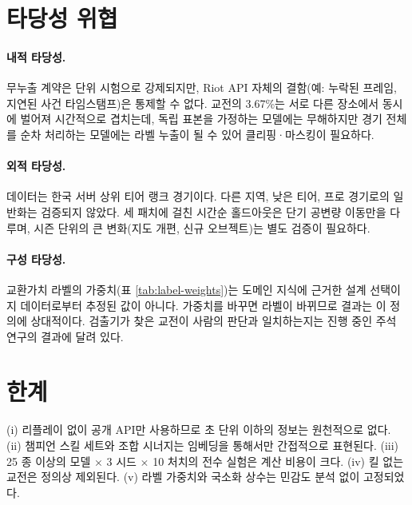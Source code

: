 \section{타당성 위협}
\label{sec:disc-threats}

\paragraph{내적 타당성.} 무누출 계약은 단위 시험으로 강제되지만, Riot API 자체의 결함(예: 누락된 프레임, 지연된 사건 타임스탬프)은 통제할 수 없다. 교전의 3.67\%는 서로 다른 장소에서 동시에 벌어져 시간적으로 겹치는데, 독립 표본을 가정하는 모델에는 무해하지만 경기 전체를 순차 처리하는 모델에는 라벨 누출이 될 수 있어 클리핑·마스킹이 필요하다.

\paragraph{외적 타당성.} 데이터는 한국 서버 상위 티어 랭크 경기이다. 다른 지역, 낮은 티어, 프로 경기로의 일반화는 검증되지 않았다. 세 패치에 걸친 시간순 홀드아웃은 단기 공변량 이동만을 다루며, 시즌 단위의 큰 변화(지도 개편, 신규 오브젝트)는 별도 검증이 필요하다.

\paragraph{구성 타당성.} 교환가치 라벨의 가중치(표 \ref{tab:label-weights})는 도메인 지식에 근거한 설계 선택이지 데이터로부터 추정된 값이 아니다. 가중치를 바꾸면 라벨이 바뀌므로 결과는 이 정의에 상대적이다. 검출기가 찾은 교전이 사람의 판단과 일치하는지는 진행 중인 주석 연구의 결과에 달려 있다.

\section{한계}
\label{sec:disc-limitations}

(i) 리플레이 없이 공개 API만 사용하므로 초 단위 이하의 정보는 원천적으로 없다. (ii) 챔피언 스킬 세트와 조합 시너지는 임베딩을 통해서만 간접적으로 표현된다. (iii) 25 종 이상의 모델 $\times$ 3 시드 $\times$ 10 처치의 전수 실험은 계산 비용이 크다. (iv) 킬 없는 교전은 정의상 제외된다. (v) 라벨 가중치와 국소화 상수는 민감도 분석 없이 고정되었다.
